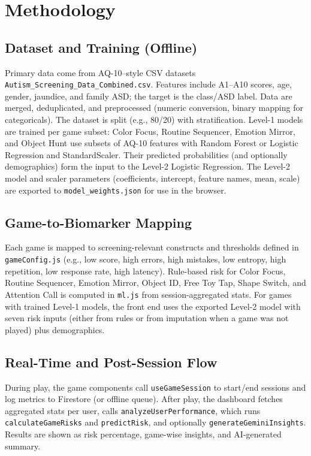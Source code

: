\documentclass[12pt,a4paper]{report}
\begin{document}
\section{Methodology}
\subsection{Dataset and Training (Offline)}
Primary data come from AQ-10–style CSV datasets \texttt{Autism\_Screening\_Data\_Combined.csv}. Features include A1--A10 scores, age, gender, jaundice, and family ASD; the target is the class/ASD label. Data are merged, deduplicated, and preprocessed (numeric conversion, binary mapping for categoricals). The dataset is split (e.g., 80/20) with stratification. Level-1 models are trained per game subset: Color Focus, Routine Sequencer, Emotion Mirror, and Object Hunt use subsets of AQ-10 features with Random Forest or Logistic Regression and StandardScaler. Their predicted probabilities (and optionally demographics) form the input to the Level-2 Logistic Regression. The Level-2 model and scaler parameters (coefficients, intercept, feature names, mean, scale) are exported to \texttt{model\_weights.json} for use in the browser.
\subsection{Game-to-Biomarker Mapping}
Each game is mapped to screening-relevant constructs and thresholds defined in \texttt{gameConfig.js} (e.g., low score, high errors, high mistakes, low entropy, high repetition, low response rate, high latency). Rule-based risk for Color Focus, Routine Sequencer, Emotion Mirror, Object ID, Free Toy Tap, Shape Switch, and Attention Call is computed in \texttt{ml.js} from session-aggregated stats. For games with trained Level-1 models, the front end uses the exported Level-2 model with seven risk inputs (either from rules or from imputation when a game was not played) plus demographics.
\subsection{Real-Time and Post-Session Flow}
During play, the game components call \texttt{useGameSession} to start/end sessions and log metrics to Firestore (or offline queue). After play, the dashboard fetches aggregated stats per user, calls \texttt{analyzeUserPerformance}, which runs \texttt{calculateGameRisks} and \texttt{predictRisk}, and optionally \texttt{generateGeminiInsights}. Results are shown as risk percentage, game-wise insights, and AI-generated summary.
\end{document}
